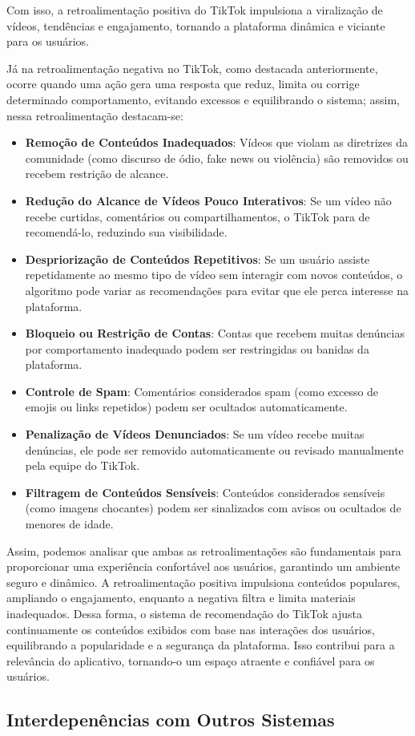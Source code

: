 Com isso, a retroalimentação positiva do TikTok impulsiona a viralização de vídeos, tendências e engajamento, tornando a plataforma dinâmica e viciante para os usuários.\vskip0.3cm

Já na retroalimentação negativa no TikTok, como destacada anteriormente, ocorre quando uma ação gera uma resposta que reduz, limita ou corrige determinado comportamento, evitando excessos e equilibrando o sistema; assim, nessa retroalimentação destacam-se:

\begin{itemize}
\item \textbf{Remoção de Conteúdos Inadequados}:
Vídeos que violam as diretrizes da comunidade (como discurso de ódio, fake news ou violência) são removidos ou recebem restrição de alcance.

\item \textbf{Redução do Alcance de Vídeos Pouco Interativos}:
Se um vídeo não recebe curtidas, comentários ou compartilhamentos, o TikTok para de recomendá-lo, reduzindo sua visibilidade.

\item \textbf{Despriorização de Conteúdos Repetitivos}:
Se um usuário assiste repetidamente ao mesmo tipo de vídeo sem interagir com novos conteúdos, o algoritmo pode variar as recomendações para evitar que ele perca interesse na plataforma.

\item \textbf{Bloqueio ou Restrição de Contas}:
Contas que recebem muitas denúncias por comportamento inadequado podem ser restringidas ou banidas da plataforma.

\item \textbf{Controle de Spam}: 
Comentários considerados spam (como excesso de emojis ou links repetidos) podem ser ocultados automaticamente.

\item \textbf{Penalização de Vídeos Denunciados}:
Se um vídeo recebe muitas denúncias, ele pode ser removido automaticamente ou revisado manualmente pela equipe do TikTok.

\item \textbf{Filtragem de Conteúdos Sensíveis}:
Conteúdos considerados sensíveis (como imagens chocantes) podem ser sinalizados com avisos ou ocultados de menores de idade.
\end{itemize}



Assim, podemos analisar que ambas as retroalimentações são fundamentais para proporcionar uma experiência confortável aos usuários, garantindo um ambiente seguro e dinâmico. A retroalimentação positiva impulsiona conteúdos populares, ampliando o engajamento, enquanto a negativa filtra e limita materiais inadequados. Dessa forma, o sistema de recomendação do TikTok ajusta continuamente os conteúdos exibidos com base nas interações dos usuários, equilibrando a popularidade e a segurança da plataforma. Isso contribui para a relevância do aplicativo, tornando-o um espaço atraente e confiável para os usuários.



\newpage
\subsection{Interdepenências com Outros Sistemas}